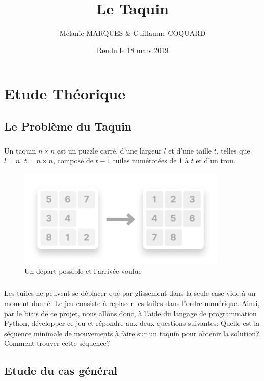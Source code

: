\documentclass[10pt,a4paper]{report}
\title{\Huge{\textbf{Le Taquin}}}
\author{Mélanie MARQUES \& Guillaume COQUARD}
\date{Rendu le 18 mars 2019}
\begin{document}
\begin{titlepage}
\maketitle
\end{titlepage}
\chapter{Etude Théorique}
\section{Le Problème du Taquin}
\paragraph{} {Un taquin ${n \times n}$ est un puzzle carré, d'une largeur ${l}$ et d'une taille ${t}$, telles que ${l = n}$, ${t = n \times n}$, composé de ${t - 1}$ tuiles numérotées de 1 à ${t}$ et d’un trou.}
\begin{figure}[!h]
\centering
\includegraphics[keepaspectratio=true,width=10cm]{./inc/media/presentation_twoTaquins.pdf}
\caption{Un départ possible et l'arrivée voulue}
\label{presentationTwoTaquins}
\end{figure}
\paragraph{} {Les tuiles ne peuvent se déplacer que par glissement dans la seule case vide à un moment donné. Le jeu consiste à replacer les tuiles dans l’ordre numérique. Ainsi, par le biais de ce projet, nous allons donc, à l'aide du langage de programmation {\ttfamily Python}, développer ce jeu et répondre aux deux questions suivantes: Quelle est la séquence minimale de mouvements à faire sur un taquin pour obtenir la solution? Comment trouver cette séquence?}
\section{Etude du cas général}
\end{document}
